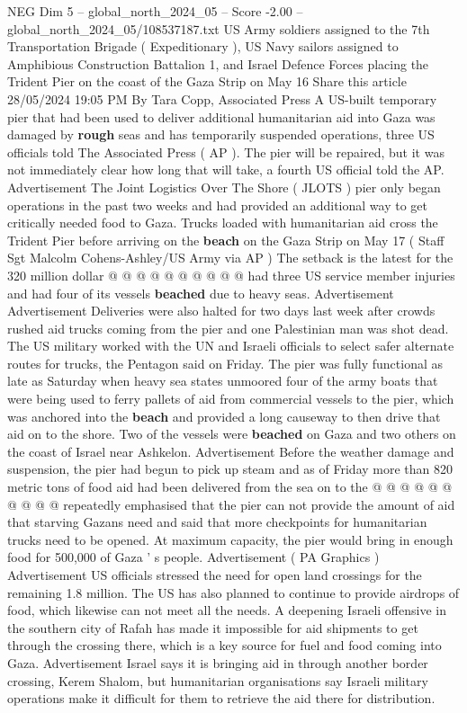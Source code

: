 \begin{textsample}{NEG Dim 5 – global\_north\_2024\_05 – Score -2.00 – global\_north\_2024\_05/108537187.txt}  \label{ex:f5_neg_280}
US Army soldiers assigned to the 7th Transportation Brigade ( Expeditionary ), US Navy sailors assigned to Amphibious Construction Battalion 1, and Israel Defence Forces placing the Trident Pier on the coast of the Gaza Strip on May 16 Share this article 28/05/2024 19:05 PM By Tara Copp, Associated Press A US-built temporary pier that had been used to deliver additional humanitarian aid into Gaza was damaged by \textbf{rough} seas and has temporarily suspended operations, three US officials told The Associated Press ( AP ).
The pier will be repaired, but it was not immediately clear how long that will take, a fourth US official told the AP.
Advertisement The Joint Logistics Over The Shore ( JLOTS ) pier only began operations in the past two weeks and had provided an additional way to get critically needed food to Gaza.
Trucks loaded with humanitarian aid cross the Trident Pier before arriving on the \textbf{beach} on the Gaza Strip on May 17 ( Staff Sgt Malcolm Cohens-Ashley/US Army via AP ) The setback is the latest for the 320 million dollar @ @ @ @ @ @ @ @ @ @ had three US service member injuries and had four of its vessels \textbf{beached} due to heavy seas.
Advertisement Advertisement Deliveries were also halted for two days last week after crowds rushed aid trucks coming from the pier and one Palestinian man was shot dead.
The US military worked with the UN and Israeli officials to select safer alternate routes for trucks, the Pentagon said on Friday.
The pier was fully functional as late as Saturday when heavy sea states unmoored four of the army boats that were being used to ferry pallets of aid from commercial vessels to the pier, which was anchored into the \textbf{beach} and provided a long causeway to then drive that aid on to the shore.
Two of the vessels were \textbf{beached} on Gaza and two others on the coast of Israel near Ashkelon.
Advertisement Before the weather damage and suspension, the pier had begun to pick up steam and as of Friday more than 820 metric tons of food aid had been delivered from the sea on to the @ @ @ @ @ @ @ @ @ @ repeatedly emphasised that the pier can not provide the amount of aid that starving Gazans need and said that more checkpoints for humanitarian trucks need to be opened.
At maximum capacity, the pier would bring in enough food for 500,000 of Gaza ' s people.
Advertisement ( PA Graphics ) Advertisement US officials stressed the need for open land crossings for the remaining 1.8 million.
The US has also planned to continue to provide airdrops of food, which likewise can not meet all the needs.
A deepening Israeli offensive in the southern city of Rafah has made it impossible for aid shipments to get through the crossing there, which is a key source for fuel and food coming into Gaza.
Advertisement Israel says it is bringing aid in through another border crossing, Kerem Shalom, but humanitarian organisations say Israeli military operations make it difficult for them to retrieve the aid there for distribution.

\end{textsample}
